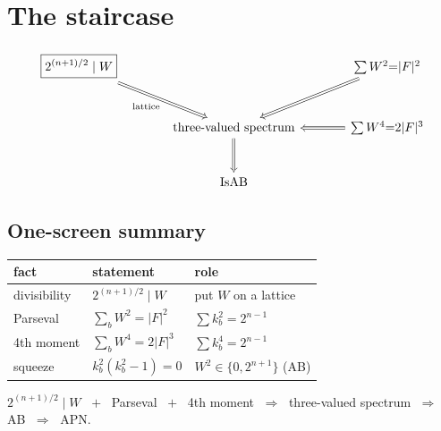 \documentclass[11pt]{article}
\begin{document}
\bigskip

\section*{The staircase}

\[
\begin{tikzcd}[row sep=large, column sep=large]
\boxed{2^{(n+1)/2}\mid W}
  \arrow[dr, Rightarrow, "{\text{lattice}}"'] & &
\sum W^2{=}|F|^2 \arrow[dl, Rightarrow] \\
& \text{three-valued spectrum} \arrow[d, Rightarrow] &
\sum W^4{=}2|F|^3 \arrow[l, Rightarrow] \\
& \mathrm{IsAB} &
\end{tikzcd}
\]

\bigskip
\subsection*{One-screen summary}

\begin{center}
\renewcommand{\arraystretch}{1.6}
\begin{tabular}{l l l}
\textbf{fact} & \textbf{statement} & \textbf{role} \\
\hline
divisibility & $2^{(n+1)/2}\mid W$ & put $W$ on a lattice \\
Parseval & $\sum_b W^2=|F|^2$ & $\sum k_b^2=2^{n-1}$ \\
4th moment & $\sum_b W^4=2|F|^3$ & $\sum k_b^4=2^{n-1}$ \\
squeeze & $k_b^2(k_b^2-1)=0$ & $W^2\in\{0,2^{n+1}\}$ (AB) \\
\end{tabular}
\end{center}

\bigskip
\noindent
\colorbox{leanbg}{\parbox{\dimexpr\linewidth-2\fboxsep}{\centering
$2^{(n+1)/2}\mid W$ $\;+\;$ Parseval $\;+\;$ 4th moment
$\;\Rightarrow\;$ three-valued spectrum $\;\Rightarrow\;$ AB $\;\Rightarrow\;$ APN.}}
\end{document}
